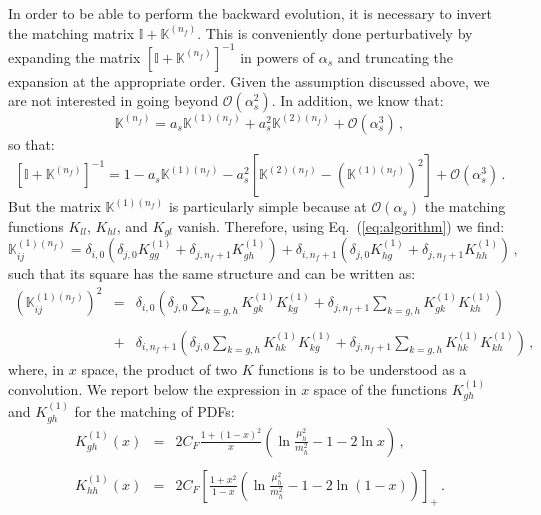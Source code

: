 \documentclass[10pt,a4paper]{article}
\begin{document}
In order to be able to perform the backward evolution, it is necessary
to invert the matching matrix $\mathbb{I}+\mathbb{K}^{(n_f)}$. This is
conveniently done perturbatively by expanding the matrix
$\left[\mathbb{I}+\mathbb{K}^{(n_f)}\right]^{-1}$ in powers of
$\alpha_s$ and truncating the expansion at the appropriate
order. Given the assumption discussed above, we are not interested in
going beyond $\mathcal{O}(\alpha_s^2)$. In addition, we know that:
\begin{equation}
\mathbb{K}^{(n_f)} = a_s \mathbb{K}^{(1)(n_f)}+a_s^2 \mathbb{K}^{(2)(n_f)}+\mathcal{O}(\alpha_s^3)\,,
\end{equation}
so that:
\begin{equation}\label{eq:inversion}
\left[\mathbb{I}+\mathbb{K}^{(n_f)}\right]^{-1} = 1 - a_s \mathbb{K}^{(1)(n_f)}-a_s^2\left[\mathbb{K}^{(2)(n_f)}-\left(\mathbb{K}^{(1)(n_f)}\right)^2\right]+\mathcal{O}(\alpha_s^3)\,.
\end{equation}
But the matrix $\mathbb{K}^{(1)(n_f)}$ is particularly simple because
at $\mathcal{O}(\alpha_s)$ the matching functions $K_{ll}$, $K_{hl}$,
and $K_{gl}$ vanish. Therefore, using Eq.~(\ref{eq:algorithm}) we
find:
\begin{equation}
\mathbb{K}_{ij}^{(1)(n_f)} =\delta_{i,0}\left(\delta_{j,0}K_{gg}^{(1)} +
\delta_{j,n_f+1}K_{gh}^{(1)}\right)+ \delta_{i,n_f+1}\left(\delta_{j,0}K_{hg}^{(1)}
+ \delta_{j,n_f+1}K_{hh}^{(1)}\right)\,,
\end{equation}
such that its square has the same structure and can be written as:
\begin{equation}\label{eq:squareK1}
\begin{array}{rcl}
\left(\mathbb{K}_{ij}^{(1)(n_f)}\right)^2 &=&\displaystyle \delta_{i,0}\left(\delta_{j,0}\sum_{k=g,h}K_{gk}^{(1)} K_{kg}^{(1)} +
\delta_{j,n_f+1}\sum_{k=g,h}K_{gk}^{(1)} K_{kh}^{(1)}\right)\\
\\
  &+&\displaystyle  \delta_{i,n_f+1}\left(\delta_{j,0}\sum_{k=g,h}K_{hk}^{(1)} K_{kg}^{(1)}
+ \delta_{j,n_f+1}\sum_{k=g,h}K_{hk}^{(1)} K_{kh}^{(1)}\right)\,,
\end{array}
\end{equation}
where, in $x$ space, the product of two $K$ functions is to be
understood as a convolution. We report below the expression in $x$
space of the functions $K_{gh}^{(1)}$ and $K_{gh}^{(1)}$ for the
matching of PDFs:
\begin{equation}
\begin{array}{rcl}
\displaystyle K_{gh}^{(1)}(x) &=&\displaystyle 
2C_F\frac{1+(1-x)^2}{x}\left(\ln\frac{\mu_h^2}{m_h^2}-1-2\ln x\right)\,,\\
\\
\displaystyle K_{hh}^{(1)}(x) &=&\displaystyle 
2C_F\left[\frac{1+x^2}{1-x}\left(\ln\frac{\mu_h^2}{m_h^2}-1-2\ln(1-x)\right)\right]_+\,.
\end{array}
\end{equation}
\end{document}
